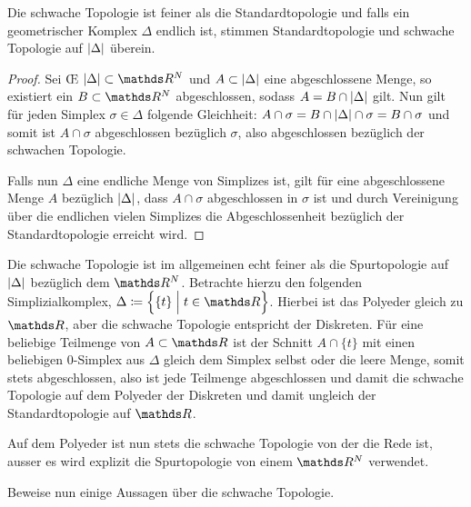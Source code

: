 \begin{Lem}
  Die schwache Topologie ist feiner als die Standardtopologie und
  falls ein geometrischer Komplex $\Delta$ endlich ist, stimmen
  Standardtopologie und schwache Topologie auf $\left| \Delta \right|$ überein.
  \begin{proof}
    Sei \OE\; $\gr{\Delta} \subset \R^N$ und $A \subset \left| \Delta \right|$
    eine abgeschlossene Menge, so existiert ein $B \subset \R^N$
    abgeschlossen, sodass $A = B \cap \left| \Delta \right|$ gilt. Nun gilt für
    jeden Simplex $\sigma \in \Delta$ folgende Gleichheit:
    $A \cap \sigma = B \cap \left| \Delta \right| \cap \sigma = B \cap \sigma$
    und somit ist $A \cap \sigma$ abgeschlossen bezüglich $\sigma$,
    also abgeschlossen bezüglich der schwachen Topologie.
		
    Falls nun $\Delta$ eine endliche Menge von Simplizes ist, gilt für
    eine abgeschlossene Menge $A$ bezüglich $\left| \Delta \right|$, dass
    $A \cap \sigma$ abgeschlossen in $\sigma$ ist und durch
    Vereinigung über die endlichen vielen Simplizes die
    Abgeschlossenheit bezüglich der Standardtopologie erreicht wird.
  \end{proof}
\end{Lem}

\begin{Bem}
  Die schwache Topologie ist im allgemeinen echt feiner als die
  Spurtopologie auf $\left| \Delta \right|$ bezüglich dem $\R^N$. Betrachte
  hierzu den folgenden Simplizialkomplex,
  $\Delta \coloneqq \set{ \{t\} }{t \in \R}$.  Hierbei ist das Polyeder
  gleich zu $\R$, aber die schwache Topologie entspricht der
  Diskreten. Für eine beliebige Teilmenge von $A \subset \R$ ist der
  Schnitt $A \cap \{ t \}$ mit einen beliebigen $0$-Simplex aus
  $\Delta$ gleich dem Simplex selbst oder die leere Menge, somit stets
  abgeschlossen, also ist jede Teilmenge abgeschlossen und damit die
  schwache Topologie auf dem Polyeder der Diskreten und damit ungleich
  der Standardtopologie auf $\R$.
\end{Bem}

Auf dem Polyeder ist nun stets die schwache Topologie von der die Rede
ist, ausser es wird explizit die Spurtopologie von einem $\R^N$
verwendet.

Beweise nun einige Aussagen über die schwache Topologie.

